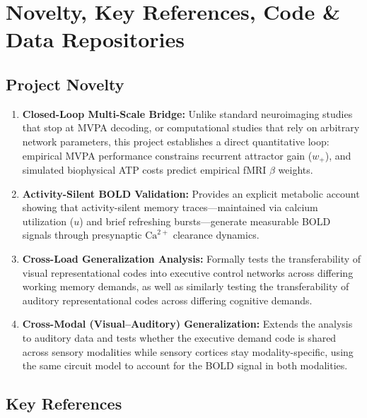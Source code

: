\documentclass[11pt,a4paper]{article}
\begin{document}
\section{Novelty, Key References, Code \& Data Repositories}

\subsection{Project Novelty}

\begin{enumerate}
    \item \textbf{Closed-Loop Multi-Scale Bridge:} Unlike standard neuroimaging studies that stop at MVPA decoding, or computational studies that rely on arbitrary network parameters, this project establishes a direct quantitative loop: empirical MVPA performance constrains recurrent attractor gain ($w_+$), and simulated biophysical ATP costs predict empirical fMRI $\beta$ weights.
    \item \textbf{Activity-Silent BOLD Validation:} Provides an explicit metabolic account showing that activity-silent memory traces---maintained via calcium utilization ($u$) and brief refreshing bursts---generate measurable BOLD signals through presynaptic $\text{Ca}^{2+}$ clearance dynamics.
    \item \textbf{Cross-Load Generalization Analysis:} Formally tests the transferability of visual representational codes into executive control networks across differing working memory demands, as well as similarly testing the transferability of auditory representational codes across differing cognitive demands.
    \item \textbf{Cross-Modal (Visual--Auditory) Generalization:} Extends the analysis to auditory data and tests whether the executive demand code is shared across sensory modalities while sensory cortices stay modality-specific, using the same circuit model to account for the BOLD signal in both modalities.
\end{enumerate}

\subsection{Key References}
\end{document}
